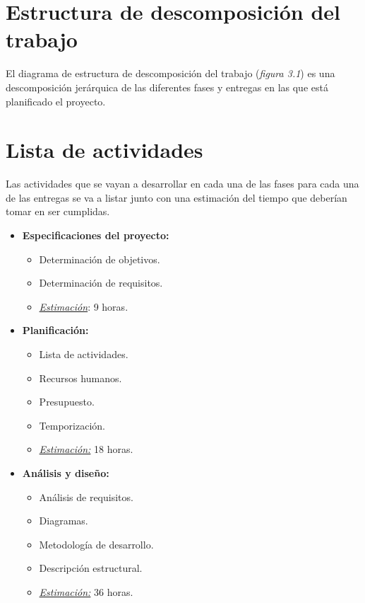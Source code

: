 \section{Estructura de descomposición del trabajo}

El diagrama de estructura de descomposición del trabajo (\textit{figura 3.1}) es una descomposición jerárquica de las diferentes fases y entregas en las que está planificado el proyecto.

\newpage
\section{Lista de actividades}

Las actividades que se vayan a desarrollar en cada una de las fases para cada una de las entregas se va a listar junto con una estimación del tiempo que deberían tomar en ser cumplidas.

\begin{itemize}
   \item \textbf{Especificaciones del proyecto:}
   \begin{itemize}
    \item Determinación de objetivos.
    \item Determinación de requisitos.
    \item \underline{\textit{Estimación}}: 9 horas.
    \end{itemize}
\end{itemize}

\begin{itemize}
   \item \textbf{Planificación:}
   \begin{itemize}
    \item Lista de actividades.
    \item Recursos humanos.
    \item Presupuesto.
    \item Temporización.
    \item \underline{\textit{Estimación:}} 18 horas.
   \end{itemize}
\end{itemize}

\begin{itemize}
   \item \textbf{Análisis y diseño:}
   \begin{itemize}
    \item Análisis de requisitos.
    \item Diagramas.
    \item Metodología de desarrollo.
    \item Descripción estructural.
    \item \underline{\textit{Estimación:}} 36 horas.
   \end{itemize}
\end{itemize}

